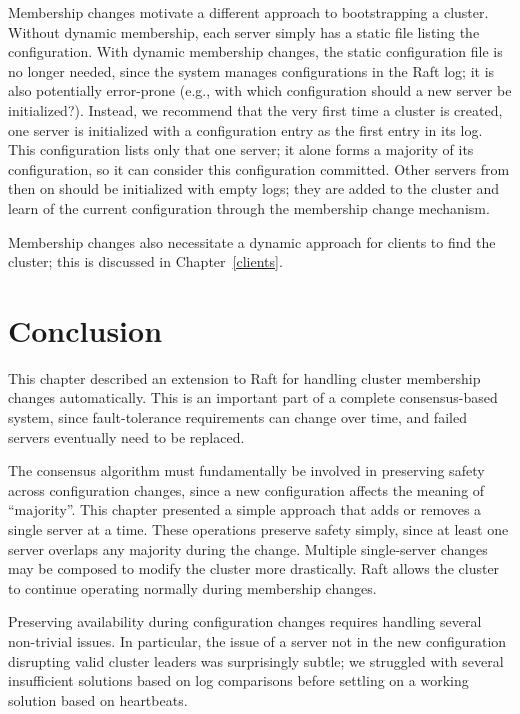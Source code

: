 Membership changes motivate a different approach to bootstrapping a
cluster. Without dynamic membership, each server simply has a static
file listing the configuration. With dynamic membership changes, the
static configuration file is no longer needed, since the system manages
configurations in the Raft log; it is also potentially error-prone
(e.g., with which configuration should a new server be initialized?).
Instead, we recommend that the very first time a cluster is created, one
server is initialized with a configuration entry as the first entry in
its log. This configuration lists only that one server; it alone forms a
majority of its configuration, so it can consider this configuration
committed. Other servers from then on should be initialized with empty
logs; they are added to the cluster and learn of the current
configuration through the membership change mechanism.

Membership changes also necessitate a dynamic approach for clients to
find the cluster; this is discussed in Chapter~\ref{clients}.

\section{Conclusion}

This chapter described an extension to Raft for handling cluster
membership changes automatically. This is an important part of a
complete consensus-based system, since fault-tolerance requirements
can change over time, and failed servers eventually need to be replaced.

The consensus algorithm must fundamentally be involved in preserving
safety across configuration changes, since a new configuration affects
the meaning of ``majority''. This chapter presented a simple approach
that adds or removes a single server at a time. These operations preserve
safety simply, since at least one server overlaps any majority during
the change. Multiple single-server changes may be composed to modify the
cluster more drastically. Raft allows the cluster to continue operating
normally during membership changes.

Preserving availability during configuration changes requires handling
several non-trivial issues. In particular, the issue of a server not in
the new configuration disrupting valid cluster leaders was surprisingly
subtle; we struggled with several insufficient solutions based on log
comparisons before settling on a working solution based on heartbeats.
